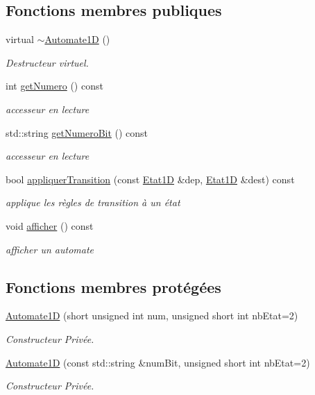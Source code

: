 \subsection*{Fonctions membres publiques}
\begin{DoxyCompactItemize}
\item 
virtual \hyperlink{class_automate1_d_a4c9acb3a13d1e6e81eba2b9551f350ec}{$\sim$\+Automate1D} ()
\begin{DoxyCompactList}\small\item\em Destructeur virtuel. \end{DoxyCompactList}\item 
int \hyperlink{class_automate1_d_a3ad4c7b525674ea7abdfdaa5dbf3e83e}{get\+Numero} () const 
\begin{DoxyCompactList}\small\item\em accesseur en lecture \end{DoxyCompactList}\item 
std\+::string \hyperlink{class_automate1_d_a165ec2dbac45a6d8731fb564efb72095}{get\+Numero\+Bit} () const 
\begin{DoxyCompactList}\small\item\em accesseur en lecture \end{DoxyCompactList}\item 
bool \hyperlink{class_automate1_d_a95d43afbf8f9a3272a448e145bacee2b}{appliquer\+Transition} (const \hyperlink{class_etat1_d}{Etat1D} \&dep, \hyperlink{class_etat1_d}{Etat1D} \&dest) const 
\begin{DoxyCompactList}\small\item\em applique les règles de transition à un état \end{DoxyCompactList}\item 
void \hyperlink{class_automate1_d_ade2e9e03aef92b66c7f41f38e54e61b1}{afficher} () const 
\begin{DoxyCompactList}\small\item\em afficher un automate \end{DoxyCompactList}\end{DoxyCompactItemize}
\subsection*{Fonctions membres protégées}
\begin{DoxyCompactItemize}
\item 
\hyperlink{class_automate1_d_a80210daacd80e5b0ce9132ac3c6d074c}{Automate1D} (short unsigned int num, unsigned short int nb\+Etat=2)
\begin{DoxyCompactList}\small\item\em Constructeur Privée. \end{DoxyCompactList}\item 
\hyperlink{class_automate1_d_a91c67e3e10240866e641c0824531acdb}{Automate1D} (const std\+::string \&num\+Bit, unsigned short int nb\+Etat=2)
\begin{DoxyCompactList}\small\item\em Constructeur Privée. \end{DoxyCompactList}\end{DoxyCompactItemize}
